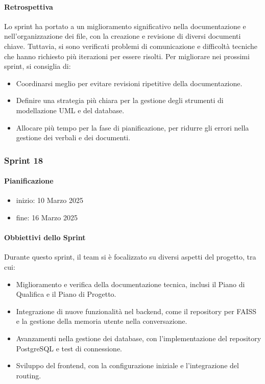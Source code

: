 \documentclass{article}
\begin{document}
            \paragraph{Retrospettiva}
            Lo sprint ha portato a un miglioramento significativo nella documentazione e nell'organizzazione dei file, con la creazione e revisione di diversi documenti chiave. Tuttavia, si sono verificati problemi di comunicazione e difficoltà tecniche che hanno richiesto più iterazioni per essere risolti. Per migliorare nei prossimi sprint, si consiglia di:
            \begin{itemize}
                \item Coordinarsi meglio per evitare revisioni ripetitive della documentazione.
                \item Definire una strategia più chiara per la gestione degli strumenti di modellazione UML e del database.
                \item Allocare più tempo per la fase di pianificazione, per ridurre gli errori nella gestione dei verbali e dei documenti.
            \end{itemize}
                
            \subsubsection{Sprint 18}
            \paragraph{Pianificazione}
                \begin{itemize}
                    \item inizio: 10 Marzo 2025
                    \item fine: 16 Marzo 2025
                \end{itemize}
        
            \paragraph{Obbiettivi dello Sprint}
            Durante questo sprint, il team si è focalizzato su diversi aspetti del progetto, tra cui:
            \begin{itemize}
                \item Miglioramento e verifica della documentazione tecnica, inclusi il Piano di Qualifica e il Piano di Progetto.
                \item Integrazione di nuove funzionalità nel backend, come il repository per FAISS e la gestione della memoria utente nella conversazione.
                \item Avanzamenti nella gestione dei database, con l'implementazione del repository PostgreSQL e test di connessione.
                \item Sviluppo del frontend, con la configurazione iniziale e l’integrazione del routing.
            \end{itemize}
            
\end{document}
